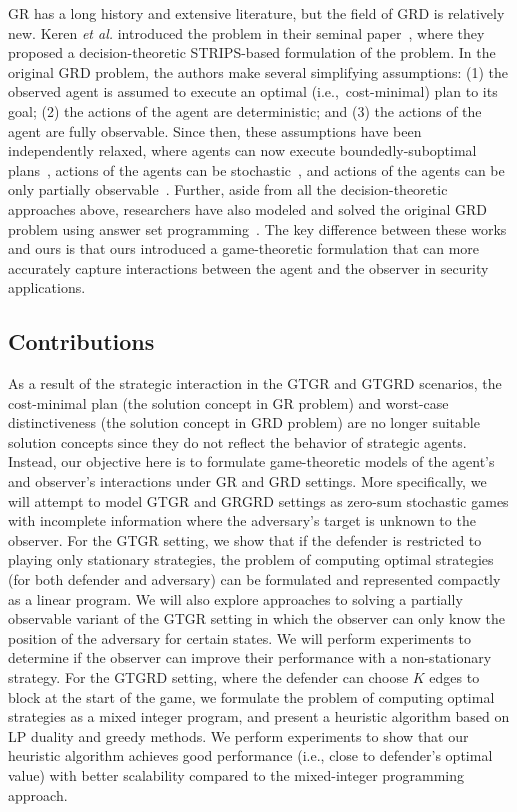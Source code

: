 GR has a long history and extensive literature, but the field of GRD is relatively new. Keren \emph{et al.} introduced the problem in their seminal paper~\cite{keren:14}, where they proposed a decision-theoretic STRIPS-based formulation of the problem. In the original GRD problem, the authors make several simplifying assumptions: (1) the observed agent is assumed to execute an optimal (i.e.,~cost-minimal) plan to its goal; (2) the actions of the agent are deterministic; and (3) the actions of the agent are fully observable. Since then, these assumptions have been independently relaxed, where agents can now execute boundedly-suboptimal plans~\cite{keren:15}, actions of the agents can be stochastic~\cite{wayllace:16}, and actions of the agents can be only partially observable~\cite{keren:16}. Further, aside from all the decision-theoretic approaches above, researchers have also modeled and solved the original GRD problem using answer set programming~\cite{son:16}. The key difference between these works and ours is that ours introduced a game-theoretic formulation that can more accurately capture interactions between the agent and the observer in security applications.  

\subsection{Contributions}
As a result of the strategic interaction in the GTGR and GTGRD scenarios, the cost-minimal plan (the solution concept in GR problem) 
and worst-case distinctiveness (the solution concept in GRD problem)
are no longer suitable solution concepts since they do not reflect the behavior of strategic agents.
Instead, our objective here is to formulate game-theoretic models of the agent's and observer's interactions 
under GR and GRD settings. 
More specifically, we will attempt to model GTGR and GRGRD settings as zero-sum stochastic games
with incomplete information where the adversary's target is unknown to the observer. 
For the GTGR setting,
we show that if the defender is restricted to playing only stationary strategies, 
the problem of computing optimal strategies (for both defender and adversary)
can be formulated and represented compactly as a linear program. We will also explore approaches to solving a partially observable variant of the GTGR setting in which the observer can only know the position of the adversary for certain states. We will perform experiments to determine if the observer can improve their performance with a non-stationary strategy.
For the GTGRD setting,
where the defender can choose $K$ edges to block at the start of the game, 
we formulate the problem of computing optimal strategies as a mixed integer program,
and present a heuristic algorithm
based on LP duality and greedy methods.
We perform experiments to show that our heuristic algorithm
achieves good performance (i.e., close to defender's optimal value) with better scalability
compared to the mixed-integer programming approach.

